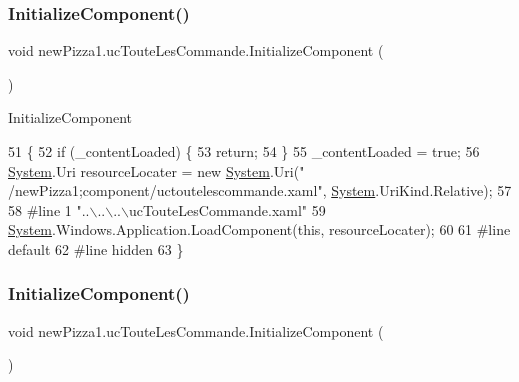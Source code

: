 \subsubsection{\texorpdfstring{Initialize\+Component()}{InitializeComponent()}\hspace{0.1cm}{\footnotesize\ttfamily [2/6]}}
{\footnotesize\ttfamily void new\+Pizza1.\+uc\+Toute\+Les\+Commande.\+Initialize\+Component (\begin{DoxyParamCaption}{ }\end{DoxyParamCaption})\hspace{0.3cm}{\ttfamily [inline]}}



Initialize\+Component 


\begin{DoxyCode}
51                                           \{
52             \textcolor{keywordflow}{if} (\_contentLoaded) \{
53                 \textcolor{keywordflow}{return};
54             \}
55             \_contentLoaded = \textcolor{keyword}{true};
56             \hyperlink{namespaceSystem}{System}.Uri resourceLocater = \textcolor{keyword}{new} \hyperlink{namespaceSystem}{System}.Uri(\textcolor{stringliteral}{"
      /newPizza1;component/uctoutelescommande.xaml"}, \hyperlink{namespaceSystem}{System}.UriKind.Relative);
57             
58 \textcolor{preprocessor}{            #line 1 "..\(\backslash\)..\(\backslash\)..\(\backslash\)ucTouteLesCommande.xaml"}
59             \hyperlink{namespaceSystem}{System}.Windows.Application.LoadComponent(\textcolor{keyword}{this}, resourceLocater);
60             
61 \textcolor{preprocessor}{            #line default}
62 \textcolor{preprocessor}{            #line hidden}
63         \}
\end{DoxyCode}
\mbox{\label{classnewPizza1_1_1ucTouteLesCommande_a8349ab5709ac09dd8c7e3f8d2cc0b633}} 
\subsubsection{\texorpdfstring{Initialize\+Component()}{InitializeComponent()}\hspace{0.1cm}{\footnotesize\ttfamily [3/6]}}
{\footnotesize\ttfamily void new\+Pizza1.\+uc\+Toute\+Les\+Commande.\+Initialize\+Component (\begin{DoxyParamCaption}{ }\end{DoxyParamCaption})\hspace{0.3cm}{\ttfamily [inline]}}



